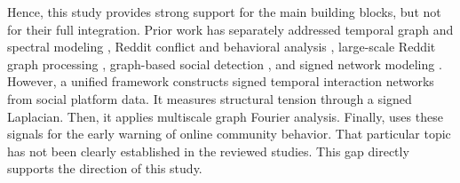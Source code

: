 \documentclass[a4paper,fleqn]{cas-dc}
\begin{document}
Hence, this study provides strong support for the main building blocks, but not for their full integration. Prior work has separately addressed temporal graph and spectral modeling  \cite{1_Mcneil2021, 10_yuan2025}, Reddit conflict and behavioral analysis \cite{2_Zhu2022, 3_Vachher2020, 7_Goglia2024, 9_Gothard2020}, large-scale Reddit graph processing \cite{4_Ravi2024, 5_Huber2022}, graph-based social detection \cite{8_ma2025, 11_Nivedita2025}, and signed network modeling \cite{12_Babul2024, 13_caimo2026}. However, a unified framework constructs signed temporal interaction networks from social platform data. It measures structural tension through a signed Laplacian. Then, it applies multiscale graph Fourier analysis. Finally, uses these signals for the early warning of online community behavior. That particular topic has not been clearly established in the reviewed studies. This gap directly supports the direction of this study.  
\end{document}
